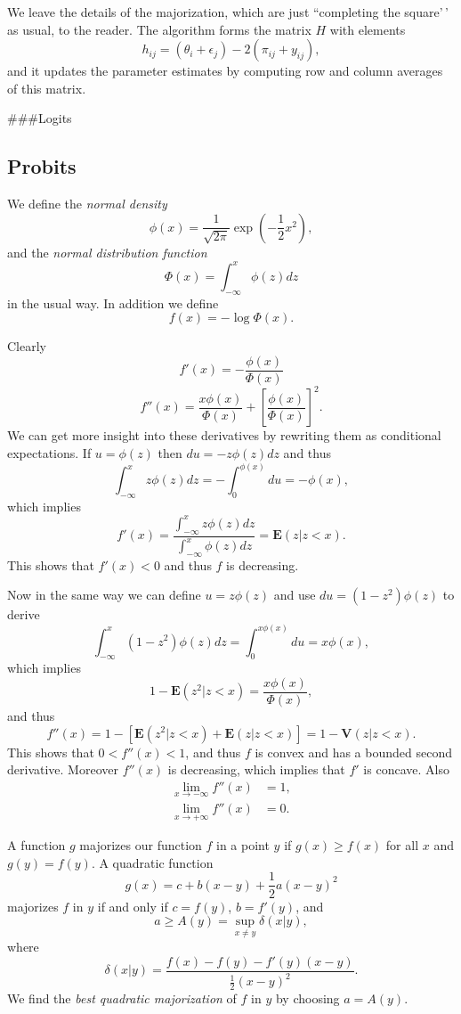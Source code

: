 \documentclass[
  12pt,
]{book}
\begin{document}
We leave the details of the majorization, which are just
``completing the square'\,' as usual, to the reader. The algorithm
forms the matrix \(H\) with elements
\[
h_{ij}=(\theta_i+\epsilon_j)-2(\pi_{ij}+y_{ij}),
\]
and it updates the parameter estimates by computing row and
column averages of this matrix.

\#\#\#Logits

\hypertarget{probits}{%
\subsection{Probits}\label{probits}}

We define the \emph{normal density}
\[
\phi(x)=\frac{1}{\sqrt{2\pi}}\exp(-\frac12 x^2),
\]
and the \emph{normal distribution function}
\[
\Phi(x)=\int_{-\infty}^x\phi(z)dz
\]
in the usual way. In addition we define
\[
f(x)=-\log\Phi(x).
\]

Clearly
\[
f'(x)=-\frac{\phi(x)}{\Phi(x)}
\]
\[
f''(x)=\frac{x\phi(x)}{\Phi(x)}+\left[\frac{\phi(x)}{\Phi(x)}\right]^2.
\]
We can get more insight into these derivatives by rewriting them as conditional expectations.
If \(u=\phi(z)\) then \(du=-z\phi(z)dz\) and thus
\[
\int_{-\infty}^x z\phi(z)dz=-\int_0^{\phi(x)}du=-\phi(x),
\]
which implies
\[
f'(x)=\frac{\int_{-\infty}^xz\phi(z)dz}{\int_{-\infty}^x\phi(z)dz}=\mathbf{E}(z|z<x).
\]
This shows that \(f'(x)<0\) and thus \(f\) is decreasing.

Now in the same way we can define \(u=z\phi(z)\) and use \(du=(1-z^2)\phi(z)\) to derive
\[
\int_{-\infty}^x (1-z^2)\phi(z)dz=\int_0^{x\phi(x)}du=x\phi(x),
\]
which implies
\[
1-\mathbf{E}(z^2|z<x)=\frac{x\phi(x)}{\Phi(x)},
\]
and thus
\[
f''(x)=1-[\mathbf{E}(z^2|z<x)+\mathbf{E}(z|z<x)]=1-\mathbf{V}(z|z<x).
\]
This shows that \(0<f''(x)<1\), and thus \(f\) is convex and has a bounded second derivative.
Moreover \(f''(x)\) is decreasing, which implies that \(f'\) is concave. Also
\begin{align*}
\lim_{x\rightarrow-\infty}f''(x)&=1,\\
\lim_{x\rightarrow+\infty}f''(x)&=0.
\end{align*}

A function \(g\) majorizes our function \(f\) in a point \(y\) if \(g(x)\geq f(x)\) for all \(x\) and \(g(y)=f(y)\). A quadratic function
\[
g(x)=c+b(x-y)+\frac12 a (x-y)^2
\]
majorizes \(f\) in \(y\) if and only if \(c=f(y)\), \(b=f'(y)\), and
\[
a\geq A(y)=\sup_{x\not= y}\delta(x|y),
\]
where
\[
\delta(x|y)=\frac{f(x)-f(y)-f'(y)(x-y)}{\frac12 (x-y)^2}.
\]
We find the \emph{best quadratic majorization} of \(f\) in \(y\) by choosing \(a=A(y)\).
\end{document}
